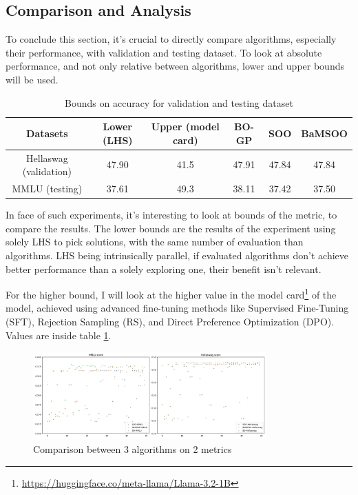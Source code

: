 \documentclass[runningheads]{llncs}
\begin{document}

\subsection{Comparison and Analysis}
\label{sec:comparison}

To conclude this section, it's crucial to directly compare algorithms, especially their performance, with validation and testing dataset. To look at absolute performance, and not only relative between algorithms, lower and upper bounds will be used. 

\begin{table}[h!]
    \centering
    \begin{tabular}{|c||c|c||c|c|c|}
    \hline
       Datasets  & Lower (LHS) & Upper (model card) & BO-GP & SOO & BaMSOO \\
    \hline
       Hellaswag (validation)  & 47.90 & 41.5 & 47.91 & 47.84 & 47.84\\
       MMLU (testing) & 37.61 & 49.3 & 38.11 & 37.42 & 37.50 \\
    \hline
    \end{tabular}
    \caption{Bounds on accuracy for validation and testing dataset}
    \label{tab:bounds}
\end{table}
In face of such experiments, it's interesting to look at bounds of the metric, to compare the results. The lower bounds are the results of the experiment using solely LHS to pick solutions, with the same number of evaluation than algorithms. LHS being intrinsically parallel, if evaluated algorithms don't achieve better performance than a solely exploring one, their benefit isn't relevant. 

For the higher bound, I will look at the higher value in the model card\footnote{\url{https://huggingface.co/meta-llama/Llama-3.2-1B}} of the model, achieved using advanced fine-tuning methods like Supervised Fine-Tuning (SFT), Rejection Sampling (RS), and Direct Preference Optimization (DPO). Values are inside table \ref{tab:bounds}.

\begin{figure}[h]
    \centering
    \includegraphics[width=0.8\textwidth]{figures/global/comparison.png}
    \caption{Comparison between 3 algorithms on 2 metrics}
    \label{fig:global_compare}
\end{figure}
\end{document}
